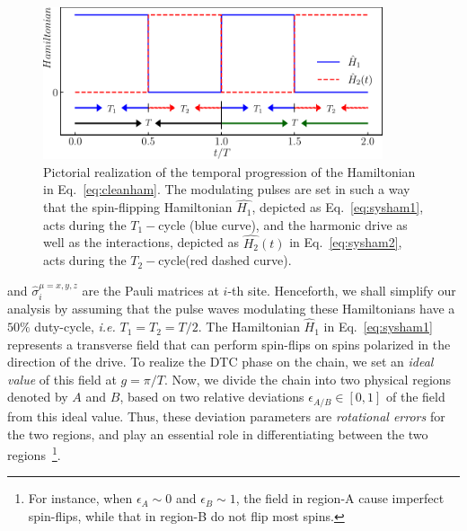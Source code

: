 \documentclass[12pt]{iopart}
\begin{document}
\begin{figure}
    \begin{center}
        \includegraphics[width=10cm]{drive_distribution.pdf}
    \end{center}
    \caption{Pictorial realization of the temporal progression of the Hamiltonian in Eq.~\eqref{eq:cleanham}. The modulating pulses are set in such a way that the spin-flipping Hamiltonian $\hat{H_1}$, depicted as Eq.~\eqref{eq:sysham1}, acts during the $T_1-$cycle (blue curve), and the harmonic drive as well as the interactions, depicted as $\hat{H_2}(t)$ in Eq.~\eqref{eq:sysham2}, acts during the $T_2-$cycle(red dashed curve).}
    \label{Fig:time_distribution}
\end{figure}	
and $\hat{\sigma}^{\mu=x,y,z}_i$ are the Pauli matrices at $i$-th site.  Henceforth, we shall simplify our analysis by assuming that the pulse waves modulating these Hamiltonians have a $50 \%$ duty-cycle, \textit{i.e.} $T_1=T_2=T/2$.  The Hamiltonian $\hat{H}_1$ in Eq.~\eqref{eq:sysham1} represents a transverse field that can perform spin-flips on spins polarized in the direction of the drive. To realize the DTC phase on the chain, we set an \textit{ideal value} of this field at $g=\pi/T$. Now, we divide the chain into two physical regions denoted by $A$ and $B$, based on two relative deviations $\epsilon_{A/B}\in[0,1]$ of the field from this ideal value. Thus, these deviation parameters are \textit{rotational errors} for the two regions, and play an essential role in differentiating between the two regions~\footnote{For instance, when $\epsilon_A \sim 0$ and $\epsilon_B \sim 1$, the field in region-A cause imperfect spin-flips, while that in region-B do not flip most spins.}.
\end{document}
